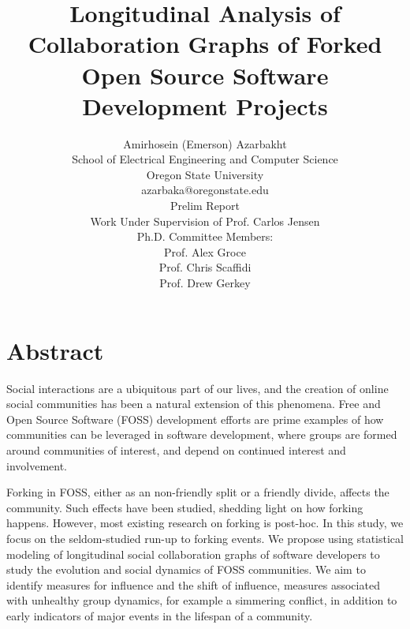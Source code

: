 \documentclass[11pt]{report}
\begin{document}
\title{Longitudinal Analysis of Collaboration Graphs of Forked Open Source Software Development Projects}

\author{Amirhosein (Emerson) Azarbakht\\
School of Electrical Engineering and Computer Science\\
Oregon State University\\
\vspace{5mm} %
azarbaka@oregonstate.edu\\
\vspace{5mm} %
Prelim Report\\
Work Under Supervision of Prof. Carlos Jensen\\
Ph.D. Committee Members:\\
Prof. Alex Groce\\
Prof. Chris Scaffidi\\
Prof. Drew Gerkey\\
}

\maketitle

\tableofcontents

\thispagestyle{empty}
\listoffigures
\listoftables

\pagebreak

\section{Abstract}



Social interactions are a ubiquitous part of our lives, and the creation of online social communities has been a natural extension of this phenomena. Free and Open Source Software (FOSS) development efforts are prime examples of how communities can be leveraged in software development, where groups are formed around communities of interest, and depend on continued interest and involvement. 

Forking in FOSS, either as an non-friendly split or a friendly divide, affects the community. Such effects have been studied, shedding light on how forking happens. However, most existing research on forking is post-hoc. In this study, we focus on the seldom-studied run-up to forking events. We propose using statistical modeling of longitudinal social collaboration graphs of software developers to study the evolution and social dynamics of FOSS communities. We aim to identify measures for influence and the shift of influence, measures associated with unhealthy group dynamics, for example a simmering conflict, in addition to early indicators of major events in the lifespan of a community. 
\end{document}
